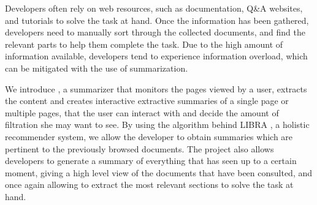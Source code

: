 \label{sec:abstract}
Developers often rely on web resources, such as documentation, Q\&A websites, and tutorials to solve the task at hand. Once the information has been gathered, developers need to manually sort through the collected documents, and find the relevant parts to help them complete the task. Due to the high amount of information available, developers tend to experience information overload, which can be mitigated with the use of summarization. 


We introduce \projectName, a summarizer that monitors the pages viewed by a user, extracts the content and creates interactive extractive summaries of a single page or multiple pages, that the user can interact with and decide the amount of filtration she may want to see. By using the algorithm behind LIBRA \cite{Ponz2017a}, a holistic recommender system, we allow the developer to obtain summaries which are pertinent to the previously browsed documents. The project also allows developers to generate a summary of everything that has seen up to a certain moment, giving a high level view of the documents that have been consulted, and once again allowing to extract the most relevant sections to solve the task at hand.